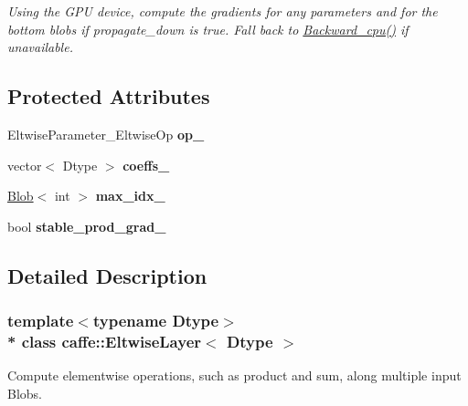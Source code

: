 \begin{DoxyCompactItemize}
\begin{DoxyCompactList}\small\item\em Using the G\+PU device, compute the gradients for any parameters and for the bottom blobs if propagate\+\_\+down is true. Fall back to \hyperlink{classcaffe_1_1EltwiseLayer_a2de367dcbd2da7fc6915ea4c133f6c3c}{Backward\+\_\+cpu()} if unavailable. \end{DoxyCompactList}\end{DoxyCompactItemize}
\subsection*{Protected Attributes}
\begin{DoxyCompactItemize}
\item 
Eltwise\+Parameter\+\_\+\+Eltwise\+Op {\bfseries op\+\_\+}\hypertarget{classcaffe_1_1EltwiseLayer_a31a6111895a4ba616da848bde583f843}{}\label{classcaffe_1_1EltwiseLayer_a31a6111895a4ba616da848bde583f843}

\item 
vector$<$ Dtype $>$ {\bfseries coeffs\+\_\+}\hypertarget{classcaffe_1_1EltwiseLayer_a6096e37b3bd8fbfe5f2a5b6acc8cd608}{}\label{classcaffe_1_1EltwiseLayer_a6096e37b3bd8fbfe5f2a5b6acc8cd608}

\item 
\hyperlink{classcaffe_1_1Blob}{Blob}$<$ int $>$ {\bfseries max\+\_\+idx\+\_\+}\hypertarget{classcaffe_1_1EltwiseLayer_af1fe1e42da04da8073e80ca8bbb0e0de}{}\label{classcaffe_1_1EltwiseLayer_af1fe1e42da04da8073e80ca8bbb0e0de}

\item 
bool {\bfseries stable\+\_\+prod\+\_\+grad\+\_\+}\hypertarget{classcaffe_1_1EltwiseLayer_a94a93d8257e6b36431e83cc3a030e904}{}\label{classcaffe_1_1EltwiseLayer_a94a93d8257e6b36431e83cc3a030e904}

\end{DoxyCompactItemize}


\subsection{Detailed Description}
\subsubsection*{template$<$typename Dtype$>$\\*
class caffe\+::\+Eltwise\+Layer$<$ Dtype $>$}

Compute elementwise operations, such as product and sum, along multiple input Blobs. 

